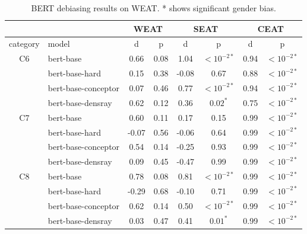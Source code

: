 \begin{table}[h]
\centering
\footnotesize
\begin{tabular}{clcccccc}
\hline
&&\multicolumn{2}{c}{WEAT}&\multicolumn{2}{c}{SEAT}&\multicolumn{2}{c}{CEAT}\\
\hline
category & model & d & p& d & p& d & p\\
\hline
C6 & bert-base & 0.66 & 0.08 &1.04&$<10^{-2*}$&0.94&$<10^{-2*}$\\
& bert-base-hard & 0.15 & 0.38&-0.08&0.67&0.88&$<10^{-2*}$\\
& bert-base-conceptor & 0.07 & 0.46&0.77&$<10^{-2*}$&0.94&$<10^{-2*}$\\
&bert-base-densray & 0.62 & 0.12&0.36&$0.02^{*}$&0.75&$<10^{-2*}$\\
\hline
C7 & bert-base & 0.60 & 0.11 &0.17&0.15&0.99&$<10^{-2*}$\\
& bert-base-hard & -0.07 & 0.56&-0.06&0.64&0.99&$<10^{-2*}$\\
& bert-base-conceptor & 0.54 & 0.14&-0.25&0.93&0.99&$<10^{-2*}$\\
& bert-base-densray & 0.09 & 0.45&-0.47&0.99&0.99&$<10^{-2*}$\\
\hline
C8& bert-base & 0.78 & 0.08 &0.81&$<10^{-2*}$&0.99&$<10^{-2*}$\\
& bert-base-hard & -0.29 & 0.68&-0.10&0.71&0.99&$<10^{-2*}$\\
& bert-base-conceptor & 0.62 & 0.14&0.50&$<10^{-2*}$&0.99&$<10^{-2*}$\\
& bert-base-densray & 0.03 & 0.47&0.41&$0.01^{*}$&0.99&$<10^{-2*}$\\

\hline
\end{tabular}
\caption{
BERT debiasing results on WEAT. * shows significant gender bias.}
\end{table}

